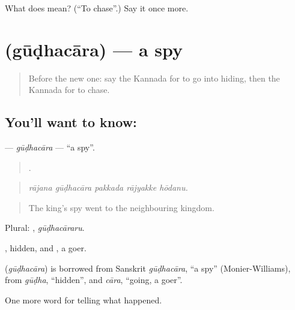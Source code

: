 \begin{tcolorbox}[breakable,colback=teal!4,colframe=teal!35!black,title={Before you move on}]
What does  mean? (\textquotedblleft{}To chase\textquotedblright{}.) Say it once more.
\end{tcolorbox}
\section[\texorpdfstring{\kn{ಗೂಢಚಾರ} (gūḍhacāra)}{ಗೂಢಚಾರ (gūḍhacāra)}]{ (gūḍhacāra) — a spy}

\label{lesson:KA-C345-gudhacara}



\begin{quote}
Before the new one: say the Kannada for to go into hiding, then the Kannada for to chase.
\end{quote}

\subsection*{You'll want to know: }
\textbf{} — \emph{gūḍhacāra} — \textquotedblleft{}a spy\textquotedblright{}.

\begin{quote}
    .
\end{quote}

\begin{quote}
\emph{rājana gūḍhacāra pakkada rājyakke hōdanu.}
\end{quote}

\begin{quote}
The king's spy went to the neighbouring kingdom.
\end{quote}

Plural: , \emph{gūḍhacāraru}.

, hidden, and , a goer.

\begin{cousinweb}
\textbf{} (\emph{gūḍhacāra}) is borrowed from Sanskrit \emph{gūḍhacāra}, \textquotedblleft{}a spy\textquotedblright{} (Monier-Williams), from \emph{gūḍha}, \textquotedblleft{}hidden\textquotedblright{}, and \emph{cāra}, \textquotedblleft{}going, a goer\textquotedblright{}.
\end{cousinweb}

\begin{grammarlens}[title={What you've built}]
One more word for telling what happened.
\end{grammarlens}

